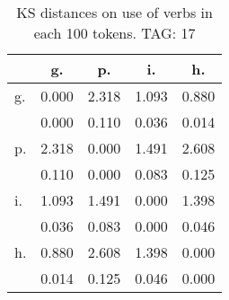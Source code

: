 \begin{table}[h!]
\begin{center}
\begin{tabular}{| l | c | c | c | c |}\hline
 & g. & p. & i. & h. \\\hline
g. & 0.000  & 2.318  & 1.093  & 0.880 \\\hline
 & 0.000  & 0.110  & 0.036  & 0.014 \\\hline
p. & 2.318  & 0.000  & 1.491  & 2.608 \\\hline
 & 0.110  & 0.000  & 0.083  & 0.125 \\\hline
i. & 1.093  & 1.491  & 0.000  & 1.398 \\\hline
 & 0.036  & 0.083  & 0.000  & 0.046 \\\hline
h. & 0.880  & 2.608  & 1.398  & 0.000 \\\hline
 & 0.014  & 0.125  & 0.046  & 0.000 \\\hline
\end{tabular}
\caption{KS distances on use of verbs in each 100 tokens. TAG: 17}
\end{center}
\end{table}